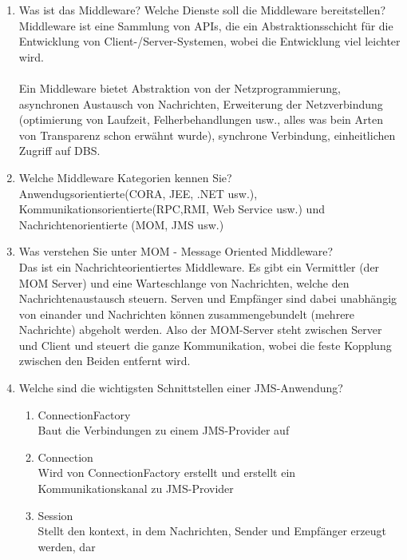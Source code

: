 \begin{enumerate}

\item Was ist das Middleware? Welche Dienste soll die Middleware bereitstellen? \\
Middleware ist eine Sammlung von APIs, die ein Abstraktionsschicht für die Entwicklung von Client-/Server-Systemen, wobei die Entwicklung viel leichter wird. \\\\
Ein Middleware bietet Abstraktion von der Netzprogrammierung, asynchronen Austausch von Nachrichten, Erweiterung der Netzverbindung (optimierung von Laufzeit, Felherbehandlungen usw., alles was bein Arten von Transparenz schon erwähnt wurde), synchrone Verbindung, einheitlichen Zugriff auf DBS.
\item Welche Middleware Kategorien kennen Sie? \\
Anwendugsorientierte(CORA, JEE, .NET usw.), Kommunikationsorientierte(RPC,RMI, Web Service usw.) und Nachrichtenorientierte (MOM, JMS usw.)

\item Was verstehen Sie unter MOM - Message Oriented Middleware? \\
Das ist ein Nachrichteorientiertes Middleware. Es gibt ein Vermittler (der MOM Server) und eine Warteschlange von Nachrichten, welche den Nachrichtenaustausch steuern. Serven und Empfänger sind dabei unabhängig von einander und Nachrichten können zusammengebundelt (mehrere Nachrichte) abgeholt werden. Also der MOM-Server steht zwischen Server und Client und steuert die ganze Kommunikation, wobei die feste Kopplung zwischen den Beiden entfernt wird.

\item Welche sind die wichtigsten Schnittstellen einer JMS-Anwendung? \\
\begin{enumerate}

\item ConnectionFactory \\
Baut die Verbindungen zu einem JMS-Provider auf

\item Connection \\
Wird von ConnectionFactory erstellt und erstellt ein Kommunikationskanal zu JMS-Provider

\item Session \\
Stellt den kontext, in dem Nachrichten, Sender und Empfänger erzeugt werden, dar


\end{enumerate}
\end{enumerate}
